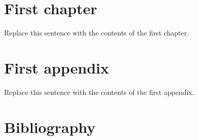 \documentclass{thesis}
\begin{document}
\generatelot

\main

\chapter{First chapter}

Replace this sentence with the contents of the first chapter.

\appendix

\chapter{First appendix}

Replace this sentence with the contents of the first appendix.

\back

\chapter{Bibliography}

\printbibliography[heading=none]
\end{document}
